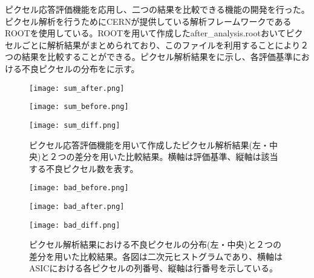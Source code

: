 ピクセル応答評価機能を応用し、二つの結果を比較できる機能の開発を行った。ピクセル解析を行うためにCERNが提供している解析フレームワークであるROOTを使用している。ROOTを用いて作成したafter\_analysis.rootおいてピクセルごとに解析結果がまとめられており、このファイルを利用することにより２つの結果を比較することができる。ピクセル解析結果をに示し、各評価基準における不良ピクセルの分布をに示す。

\begin{figure}[tbp]
 \begin{minipage}{0.33\hsize}
  \begin{center}
   \texttt{[image: sum\_after.png]}
  \end{center}
 \end{minipage}
 \begin{minipage}{0.33\hsize}
 \begin{center}
  \texttt{[image: sum\_before.png]}
 \end{center}
 \end{minipage}
 \begin{minipage}{0.33\hsize}
 \begin{center}
  \texttt{[image: sum\_diff.png]}
 \end{center}
 \end{minipage}
 \caption{ピクセル応答評価機能を用いて作成したピクセル解析結果(左・中央)と２つの差分を用いた比較結果。横軸は評価基準、縦軸は該当する不良ピクセル数を表す。}
 \label{fig:badsum}
\end{figure}

\begin{figure}[tbp]
 \begin{minipage}{0.33\hsize}
  \begin{center}
   \texttt{[image: bad\_before.png]}
  \end{center}
 \end{minipage}
 \begin{minipage}{0.33\hsize}
 \begin{center}
  \texttt{[image: bad\_after.png]}
 \end{center}
 \end{minipage}
 \begin{minipage}{0.33\hsize}
 \begin{center}
  \texttt{[image: bad\_diff.png]}
 \end{center}
 \end{minipage}
 \caption{ピクセル解析結果における不良ピクセルの分布(左・中央)と２つの差分を用いた比較結果。各図は二次元ヒストグラムであり、横軸はASICにおける各ピクセルの列番号、縦軸は行番号を示している。}
 \label{fig:badpixel}
\end{figure}

